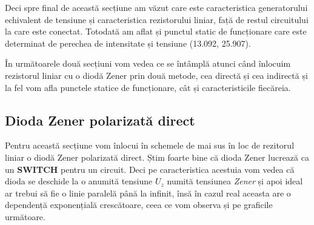 \documentclass[12pt, a4paper]{article}
\begin{document}
\vspace{2cm}
Deci spre final de această secțiune am văzut care este caracteristica generatorului echivalent de tensiune și caracteristica rezistorului liniar, față de restul circuitului la care este conectat. Totodată am aflat și punctul static de funcționare care este determinat de perechea de intensitate și tensiune (13.092, 25.907).

\vspace{2cm}
În următoarele două secțiuni vom vedea ce se întâmplă atunci când înlocuim rezistorul liniar cu o diodă Zener prin două metode, cea directă și cea indirectă și la fel vom afla punctele statice de funcționare, cât și caracteristicile fiecăreia.
\newpage

\subsection{Dioda Zener polarizată direct}
Pentru această secțiune vom înlocui în schemele de mai sus în loc de rezitorul liniar o diodă Zener polarizată direct. Știm foarte bine că dioda Zener lucrează ca un \textbf{SWITCH} pentru un circuit. Deci pe caracteristica acestuia vom vedea că dioda se deschide la o anumită tensiune $U_z$ numită tensiunea \emph{Zener} și apoi ideal ar trebui să fie o linie paralelă până la infinit, însă în cazul real aceasta are o dependență exponențială crescătoare, ceea ce vom observa și pe graficile următoare.
\end{document}
